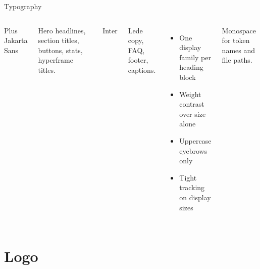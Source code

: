 \documentclass[aspectratio=169,10pt]{beamer}
\begin{document}
\begin{frame}{Typography}
  \begin{columns}[T,onlytextwidth]
    \vspace{0.4em}
    {\CollinsDisplay\Large Plus Jakarta Sans}

    \vspace{0.3em}
    Hero headlines, section titles, buttons, stats, hyperframe titles.

    \vspace{0.8em}
    \vspace{0.4em}
    {\Large Inter}

    \vspace{0.3em}
    Lede copy, FAQ, footer, captions.

    \vspace{0.4em}
    \begin{itemize}
      \item One display family per heading block
      \item Weight contrast over size alone
      \item Uppercase eyebrows only
      \item Tight tracking on display sizes
    \end{itemize}

    \vspace{0.6em}
    \vspace{0.4em}
    Monospace for token names and file paths.
  \end{columns}
\end{frame}

\section{Logo}
\end{document}

